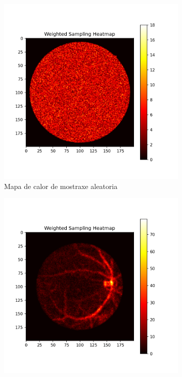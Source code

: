 \begin{figure}[tbp]
    \centering
    \begin{subfigure}[b]{0.3\textwidth}
        \centering
        \includegraphics[width=\textwidth]{imaxes/muestraje/random_sampling_heatmap.png}
        \caption{Mapa de calor de mostraxe aleatoria}
        \label{fig:random_sampling_heatmap}
    \end{subfigure}
    \hfill
    \begin{subfigure}[b]{0.3\textwidth}
        \centering
        \includegraphics[width=\textwidth]{imaxes/muestraje/weighted_sampling_heatmap.png}

\end{subfigure}
\end{figure}
